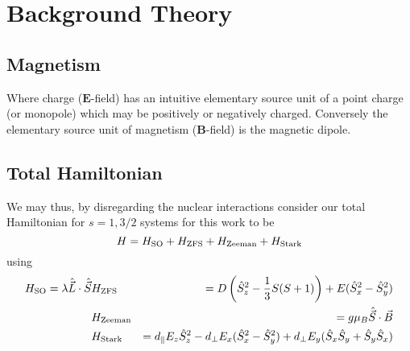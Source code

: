 \chapter{Background Theory}
\section{Magnetism}
Where charge ($\mathbf{E}$-field) has an intuitive elementary source unit of a point charge (or monopole) which may be positively or negatively charged. Conversely the elementary source unit of magnetism ($\mathbf{B}$-field) is the magnetic dipole. 

















\section{Total Hamiltonian}
We may thus, by disregarding the nuclear interactions consider our total Hamiltonian for $s=1, 3/2$ systems for this work to be 
\begin{equation}
    H = H_{\ce{SO}} + H_{\ce{ZFS}} + H_{\ce{Zeeman}} + H_{\ce{Stark}}
    \label{eq:total_hamiltonian}
\end{equation}
using 
\begin{eqnarray}
    H_{\ce{SO}} = \lambda \hat{\vec{L}} \cdot \hat{\vec{S}}
    &H_{\ce{ZFS}} &=  D\left(\hat{S}_z^2 - \frac{1}{3}S(S+1)\right)  + E(\hat{S}_x^2 - \hat{S}_y^2)\label{H_ZFS}\\ 
    &H_{\ce{Zeeman}} &= g \mu_B \hat{\vec{S}}\cdot \vec{B} \label{H_Zeeman}\\ 
    &H_{\ce{Stark}} &= d_\parallel E_z \hat{S}_z^2 - d_\perp E_x (\hat{S}_x^2 - \hat{S}_y^2) + d_\perp E_y (\hat{S}_x\hat{S}_y + \hat{S}_y \hat{S}_x) \label{H_Stark}\\
\end{eqnarray}

